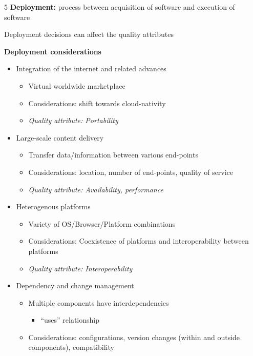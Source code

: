\documentclass[landscape,a4paper]{extarticle}
\begin{document}
\begin{multicols*}{5}
    \textbf{Deployment:} process between acquisition of software and execution of software

    Deployment decisions can affect the quality attributes

    \textbf{Deployment considerations}

    \begin{itemize}
        \item Integration of the internet and related advances
        \begin{itemize}
            \item Virtual worldwide marketplace
            \item Considerations: shift towards cloud-nativity
            \item \textit{Quality attribute: Portability}
        \end{itemize}
        \item Large-scale content delivery
        \begin{itemize}
            \item Transfer data/information between various end-points
            \item Considerations: location, number of end-points, quality of service
            \item \textit{Quality attribute: Availability, performance}
        \end{itemize}
        \item Heterogenous platforms
        \begin{itemize}
            \item Variety of OS/Browser/Platform combinations
            \item Considerations: Coexistence of platforms and interoperability between platforms
            \item \textit{Quality attribute: Interoperability}
        \end{itemize}
        \item Dependency and change management
        \begin{itemize}
            \item Multiple components have interdependencies 
            \begin{itemize}
                \item ``uses'' relationship
            \end{itemize}
            \item Considerations: configurations, version changes (within and outside components), compatibility

\end{itemize}
\end{itemize}
\end{multicols*}
\end{document}
